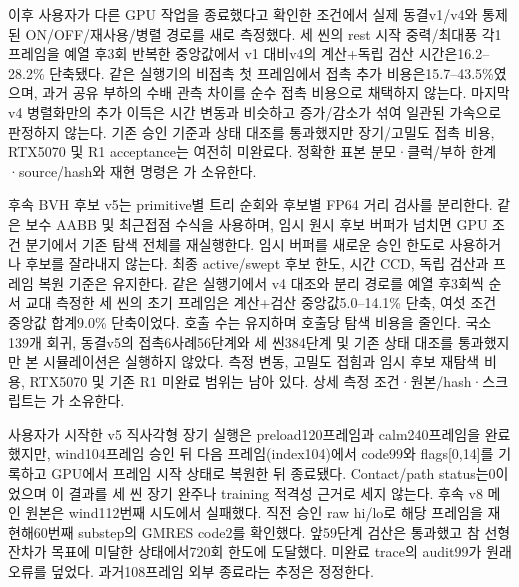 \documentclass[10pt]{article}
\begin{document}
이후 사용자가 다른 GPU 작업을 종료했다고 확인한 조건에서 실제 동결v1/v4와 통제된
ON/OFF/재사용/병렬 경로를 새로 측정했다. 세 씬의 rest 시작 중력/최대풍 각1프레임을
예열 후3회 반복한 중앙값에서 v1 대비v4의 계산+독립 검산 시간은16.2--28.2\% 단축됐다.
같은 실행기의 비접촉 첫 프레임에서 접촉 추가 비용은15.7--43.5\%였으며, 과거 공유 부하의
수배 관측 차이를 순수 접촉 비용으로 채택하지 않는다. 마지막v4 병렬화만의 추가 이득은
시간 변동과 비슷하고 증가/감소가 섞여 일관된 가속으로 판정하지 않는다.
기존 승인 기준과 상태 대조를 통과했지만 장기/고밀도 접촉 비용, RTX5070 및 R1 acceptance는
여전히 미완료다. 정확한 표본 분모·클럭/부하 한계·source/hash와 재현 명령은
가 소유한다.

후속 BVH 후보 v5는 primitive별 트리 순회와 후보별 FP64 거리 검사를 분리한다.
같은 보수 AABB 및 최근접점 수식을 사용하며, 임시 원시 후보 버퍼가 넘치면 GPU 조건 분기에서
기존 탐색 전체를 재실행한다. 임시 버퍼를 새로운 승인 한도로 사용하거나 후보를 잘라내지 않는다.
최종 active/swept 후보 한도, 시간 CCD, 독립 검산과 프레임 복원 기준은 유지한다.
같은 실행기에서 v4 대조와 분리 경로를 예열 후3회씩 순서 교대 측정한 세 씬의 초기 프레임은
계산+검산 중앙값5.0--14.1\% 단축, 여섯 조건 중앙값 합계9.0\% 단축이었다.
호출 수는 유지하며 호출당 탐색 비용을 줄인다. 국소139개 회귀, 동결v5의 접촉6사례56단계와
세 씬384단계 및 기존 상태 대조를 통과했지만 본 시뮬레이션은 실행하지 않았다.
측정 변동, 고밀도 접힘과 임시 후보 재탐색 비용, RTX5070 및 기존 R1 미완료 범위는 남아 있다.
상세 측정 조건·원본/hash·스크립트는
가 소유한다.

사용자가 시작한 v5 직사각형 장기 실행은 preload120프레임과 calm240프레임을 완료했지만,
wind104프레임 승인 뒤 다음 프레임(index104)에서 code99와 flags[0,14]를 기록하고 GPU에서
프레임 시작 상태로 복원한 뒤 종료됐다. Contact/path status는0이었으며 이 결과를 세 씬 장기
완주나 training 적격성 근거로 세지 않는다. 후속 v8 메인 원본은 wind112번째 시도에서 실패했다.
직전 승인 raw hi/lo로 해당 프레임을 재현해60번째 substep의 GMRES code2를 확인했다.
앞59단계 검산은 통과했고 참 선형 잔차가 목표에 미달한 상태에서720회 한도에 도달했다.
미완료 trace의 audit99가 원래 오류를 덮었다. 과거108프레임 외부 종료라는 추정은 정정한다.
\end{document}
